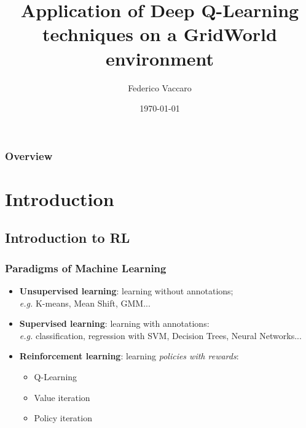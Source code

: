 \documentclass{beamer}
\title[Multiagent Systems course project]{Application of Deep Q-Learning techniques on a GridWorld environment} %
\author{Federico Vaccaro} %
\institute[UniFi] %
{
Università degli studi di Firenze \\ %
\medskip
\textit{federico.vaccaro@stud.unifi.it} %
}
\date{\today} %
\begin{document}
\begin{frame}
\titlepage %
\end{frame}

\begin{frame}
\frametitle{Overview} %
\tableofcontents %
\end{frame}


\section{Introduction} %
\subsection{Introduction to RL}
\begin{frame}
\frametitle{Paradigms of Machine Learning}
\begin{itemize}
	\item \textbf{Unsupervised learning}: learning without annotations;\\ 
	\textit{e.g.} K-means, Mean Shift, GMM...
	\item \textbf{Supervised learning}: learning with annotations:
	\\ \textit{e.g.} classification, regression with SVM, Decision Trees, Neural Networks...
	\item \textbf{Reinforcement learning}: learning \textit{policies with rewards}:\\
	\begin{itemize}
		\item Q-Learning
		\item Value iteration 
		\item Policy iteration
	\end{itemize}
\end{itemize}
\end{frame}
\end{document}

